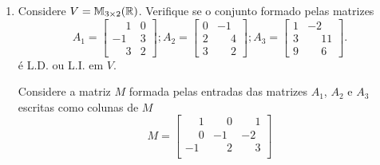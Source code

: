 \begin{exemplo}
\begin{enumerate}[label={\arabic*})]
\begin{solucao}
\begin{align*}
\begin{array}{ccc}
							0 & \phantom{-}0 & 0\\
							0 & -1 & 0
	     				\end{array}
     				\right] = M.
     		\end{align*}
     		Como a matrix $M$ possui posto 3, ent\~ao $\{p_1(x), p_2(x), p_3(x)\}$ \'e L.I. em $\mathcal{P}_4(\real)$. Observe que $M$ n\~ao tem 1 na segunda e quarta linhas. Assim vamos adicionar a $M$ uma coluna com 1 na segunda linha e outra com 1 na quarta linha, obtendo
     		\[
     			M' = \begin{bmatrix}
  					1 & \phantom{-}2 & 1 & 0 & 0\\
					0 & \phantom{-}0 & 0 & 1 & 0\\
					0 & \phantom{-}3 & 3 & 0 & 0\\
					0 & \phantom{-}0 & 0 & 0 & 1\\
					0 & -1 & 0 & 0 & 0
     			\end{bmatrix}.
     		\]
     		Assim $\mathcal{B}' = \{p_1(x), p_2(x), p_3(x),x, x^3\}$ forma uma base de $\mathcal{P}_4(\real)$ contendo $p_1(x)$, $p_2(x)$ e $p_3(x)$.
		\end{solucao}
		\item Considere $V = \mathbb{M}_{3\times 2}(\mathbb{R})$. Verifique se o conjunto formado pelas matrizes
		\[
			A_1 = \begin{bmatrix}
				\phantom{-}1 & 0\\
				-1 & 3\\
				\phantom{-}3 & 2
			\end{bmatrix}; A_2 = \begin{bmatrix}
				0 & -1\\
				2 & \phantom{-}4\\
				3 & \phantom{-}2
			\end{bmatrix}; A_3 = \begin{bmatrix}
				1 & -2\\
				3 & \phantom{-}11\\
				9 & \phantom{-}6
			\end{bmatrix}.
		\]
		\'e L.D. ou L.I. em $V$.
		\begin{solucao}
			Considere a matriz $M$ formada pelas entradas das matrizes $A_1$, $A_2$ e $A_3$ escritas como colunas de $M$
			\[
				M = \begin{bmatrix}
					\phantom{-}1 & \phantom{-}0 & \phantom{-}1\\
					\phantom{-}0 & -1 & -2\\
					-1 & \phantom{-}2 & \phantom{-}3\\

\end{bmatrix}\]
\end{solucao}
\end{enumerate}
\end{exemplo}
